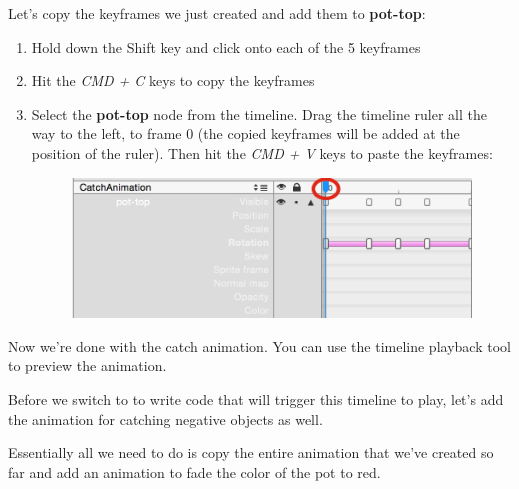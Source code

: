 \begin{leftbar}
Let's copy the keyframes we just created and add them to \textbf{pot-top}:
\begin{enumerate}
  \item Hold down the Shift key and click onto each of the 5 keyframes
  \item Hit the \textit{CMD + C} keys to copy the keyframes
  \item Select the \textbf{pot-top} node from the timeline. Drag the timeline
  ruler all the way to the left, to frame 0 (the copied keyframes will be added
  at the position of the ruler). Then hit the \textit{CMD + V} keys to paste the
  keyframes:
  \begin{figure}[H]
  \centering
  \includegraphics[width=300pt]{images/Chapter9/copy_keyframes.png}
  \end{figure}
\end{enumerate}
\end{leftbar}

Now we're done with the catch animation. You can use the timeline playback tool
to preview the animation.

Before we switch to \xcode{} to write code that will trigger this timeline to
play, let's add the animation for catching negative objects as well.

Essentially all we need to do is copy the entire animation that we've created so
far and add an animation to fade the color of the pot to red.

